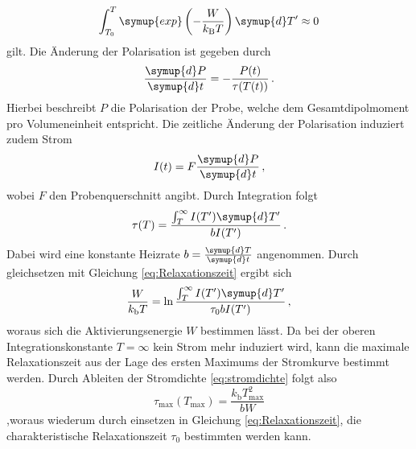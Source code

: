 \begin{equation*}
    \int_{T_0}^{T} \symup{exp} \left ( - \frac{W}{k_\text{B}T} \right ) \symup{d}T' \approx 0
\end{equation*}
gilt.
Die Änderung der Polarisation ist gegeben durch
\begin{equation*}
    \frac{\symup{d}P}{\symup{d}t}=-\frac{P(t)}{\tau(T(t))} \, .
\end{equation*}
Hierbei beschreibt $P$ die Polarisation der Probe, welche dem Gesamtdipolmoment pro Volumeneinheit entspricht.
Die zeitliche Änderung der Polarisation induziert zudem Strom
\begin{equation}
    I(t) = F\frac{\symup{d}P}{\symup{d}t} \, ,
\end{equation}
wobei $F$ den Probenquerschnitt angibt.
Durch Integration folgt 
\begin{equation}
    \tau(T) = \frac{ \int_{T}^{\infty} I(T')\symup{d}T'}{bI(T')} \, .
\end{equation}
Dabei wird eine konstante Heizrate $b = \frac{\symup{d}T}{\symup{d}t}$ angenommen.
Durch gleichsetzen mit Gleichung \eqref{eq:Relaxationszeit} ergibt sich
\begin{equation}
    \frac{W}{k_\text{b}T} = \ln \frac{ \int_{T}^{\infty} I(T')\symup{d}T'}{\tau_0 b I(T')} \, ,
    \label{eq:int}
\end{equation}
woraus sich die Aktivierungsenergie $W$ bestimmen lässt.
Da bei der oberen Integrationskonstante $T=\infty$ kein Strom mehr induziert wird, kann die maximale Relaxationszeit aus der Lage des ersten Maximums der Stromkurve bestimmt werden.
Durch Ableiten der Stromdichte \eqref{eq:stromdichte} folgt also
\begin{equation}
    \tau _\text{max}(T_\text{max}) = \frac{k_\text{b} T_\text{max} ^2}{bW}
    \label{eq:t_max}
\end{equation}
,woraus wiederum durch einsetzen in Gleichung \eqref{eq:Relaxationszeit}, die charakteristische Relaxationszeit $\tau_0$ bestimmten werden kann.


